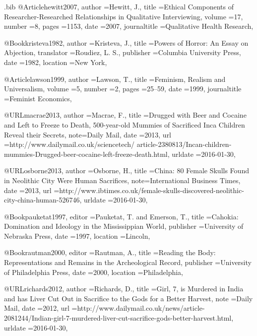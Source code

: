 \begin{filecontents}{\IJSRAidentifier.bib}
@Article{hewitt2007,
	author       ={Hewitt, J.},
	title        ={Ethical Components of Researcher-Researched Relationships in Qualitative Interviewing},
	volume       ={17},
	number       ={8},
	pages        ={1153},
	date         ={2007},
	journaltitle ={Qualitative Health Research},
}

@Book{kristeva1982,
	author       ={Kristeva, J.},
	title        ={Powers of Horror: An Essay on Abjection},
	translator   ={Roudiez, L. S.},
	publisher    ={Columbia University Press},
	date         ={1982},
	location     ={New York},
}

@Article{lawson1999,
	author       ={Lawson, T.},
	title        ={Feminism, Realism and Universalism},
	volume       ={5},
	number       ={2},
	pages        ={25--59},
	date         ={1999},
	journaltitle ={Feminist Economics},
}

@URL{macrae2013,
	author   ={Macrae, F.},
	title    ={Drugged with Beer and Cocaine and Left to Freeze to Death, 500-year-old Mummies of Sacrificed Inca Children Reveal their Secrets},
	note={Daily Mail},
	date     ={2013},
	url      ={http://www.dailymail.co.uk/sciencetech/ article-2380813/Incan-children-mummies-Drugged-beer-cocaine-left-freeze-death.html},
	urldate  ={2016-01-30},
}

@URL{osborne2013,
	author   ={Osborne, H.},
	title    ={China: 80 Female Skulls Found in Neolithic City Were Human Sacrifices},
	note={International Business Times},
	date     ={2013},
	url      ={http://www.ibtimes.co.uk/female-skulls-discovered-neolithic-city-china-human-526746},
	urldate  ={2016-01-30},
}

@Book{pauketat1997,
	editor       ={Pauketat, T. and Emerson, T.},
	title        ={Cahokia: Domination and Ideology in the Mississippian World},
	publisher    ={University of Nebraska Press},
	date         ={1997},
	location     ={Lincoln},
}

@Book{rautman2000,
	editor       ={Rautman, A.},
	title        ={Reading the Body: Representations and Remains in the Archeological Record},
	publisher    ={University of Philadelphia Press},
	date         ={2000},
	location     ={Philadelphia},
}

@URL{richards2012,
	author    ={Richards, D.},
	title     ={Girl, 7, is Murdered in India and has Liver Cut Out in Sacrifice to the Gods for a Better Harvest},
	note ={Daily Mail},
	date      ={2012},
	url       ={http://www.dailymail.co.uk/news/article-2081244/Indian-girl-7-murdered-liver-cut-sacrifice-gods-better-harvest.html},
	urldate   ={2016-01-30},
	}


\end{filecontents}
